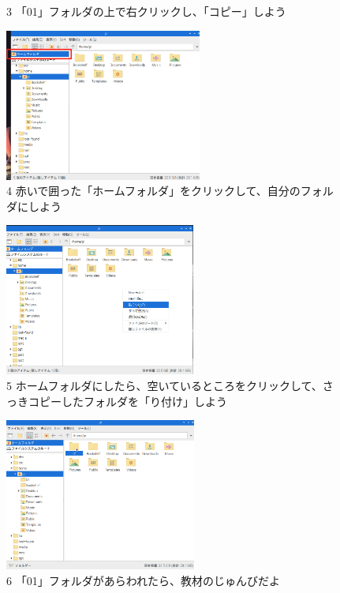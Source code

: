 \begin{figure}
\begin{minipage}{\textwidth}
\begin{minipage}{0.45\linewidth}
      3 「01」フォルダの上で右クリックし、「コピー」しよう
    \end{minipage}
    \hfill
    \vspace{20pt}
    \begin{minipage}{0.45\linewidth}
      \includegraphics[height=5cm]{text01-img/textbook-img1013.png}\\
      4 赤いで囲った「ホームフォルダ」をクリックして、自分のフォルダにしよう
    \end{minipage}    \begin{minipage}{0.45\linewidth}
      \includegraphics[height=5cm]{text01-img/textbook-img1014.png}\\
      5 ホームフォルダにしたら、空いているところをクリックして、さっきコピーしたフォルダを「り付け」しよう
    \end{minipage}
    \hfill
    \vspace{20pt}
    \begin{minipage}{0.45\linewidth}
      \includegraphics[height=5cm]{text01-img/textbook-img1015.png}\\
      6 「01」フォルダがあらわれたら、教材のじゅんびだよ
    \end{minipage}

  \end{minipage}

  \bigskip

\end{figure}

